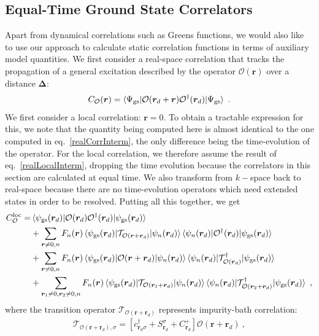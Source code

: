 \subsection{Equal-Time Ground State Correlators}\label{staticCorr}
Apart from dynamical correlations such as Greens functions, we would also like to use our approach to calculate static correlation functions in terms of auxiliary model quantities. We first consider a real-space correlation that tracks the propagation of a general excitation described by the operator \(\mathcal{O}({\bm r})\) over a distance \({\bm \Delta}\):
\begin{equation}\begin{aligned}
	C_{\mathcal{O}}({\bm r}) = \braket{\Psi_\text{gs} | \mathcal{O}({\bm r}_d + {\bm r})\mathcal{O}^\dagger({\bm r}_d) | \Psi_\text{gs}}~.
\end{aligned}\end{equation}
We first consider a local correlation: \(\bm r = 0\). To obtain a tractable expression for this, we note that the quantity being computed here is almost identical to the one computed in eq.~\ref{realCorrInterm}, the only difference being the time-evolution of the operator. For the local correlation, we therefore assume the result of eq.~\ref{realLocalInterm}, dropping the time evolution because the correlators in this section are calculated at equal time. We also transform from \(k-\)space back to real-space because there are no time-evolution operators which need extended states in order to be resolved. Putting all this together, we get
\begin{equation}\begin{aligned}
	C_{\mathcal{O}}^\text{loc} =& \braket{\psi_\text{gs}(\bm r_d) | \mathcal{O}(\bm r_d)\mathcal{O}^\dagger(\bm r_d) | \psi_\text{gs}(\bm r_d)} \\
								&+ \sum_{\bm r \neq 0, n} F_n(\bm r)\braket{\psi_\text{gs}(\bm r_d) | \mathcal{T}_{\mathcal{O}(\bm r + \bm r_d)} | \psi_n(\bm r_d)} \braket{\psi_n(\bm r_d) | \mathcal{O}^\dagger(\bm r_d) | \psi_\text{gs}(\bm r_d)}\\
								&+ \sum_{\bm r \neq 0, n} F_n(\bm r)\braket{\psi_\text{gs}(\bm r_d) | \mathcal{O}(\bm r + \bm r_d) | \psi_n(\bm r_d)} \braket{\psi_n(\bm r_d) | \mathcal{T}^\dagger_{\mathcal{O}(\bm r_d)} | \psi_\text{gs}(\bm r_d)}\\
								&+ \sum_{\bm r_1 \neq 0, \bm r_2 \neq 0, n} F_n(\bm r)\braket{\psi_\text{gs}(\bm r_d) | \mathcal{T}_{\mathcal{O}(\bm r_1 + \bm r_d)} | \psi_n(\bm r_d)} \braket{\psi_n(\bm r_d) | \mathcal{T}^\dagger_{\mathcal{O}(\bm r_2 + \bm r_d)} | \psi_\text{gs}(\bm r_d)}~,
\end{aligned}\end{equation}
where the transition operator \(\mathcal{T}_{\mathcal{O}(\bm r + \bm r_d)}\) represents impurity-bath correlation:
\begin{equation}\begin{aligned}
	\mathcal{T}_{{\mathcal{O}(\bm r + \bm r_d)},\sigma} = \left[c^\dagger_{\bm r_d\sigma} + S_{\bm r_d}^\sigma + C_{\bm r_d}^+ \right]{\mathcal{O}(\bm r + \bm r_d)}~,
\end{aligned}\end{equation}

